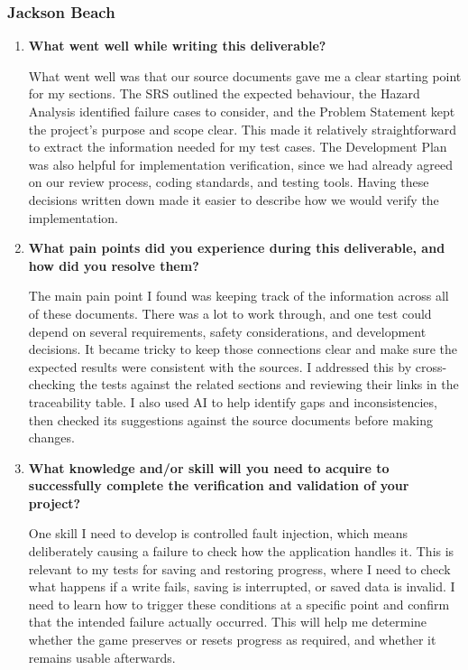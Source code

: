 \documentclass[10pt,titlepage]{article}
\begin{document}
\subsubsection*{Jackson Beach}

\begin{enumerate}

    \item \textbf{What went well while writing this deliverable?}

    What went well was that our source documents gave me a clear starting
    point for my sections. The SRS outlined the expected behaviour, the
    Hazard Analysis identified failure cases to consider, and the Problem
    Statement kept the project's purpose and scope clear. This made it
    relatively straightforward to extract the information needed for my
    test cases. The Development Plan was also helpful for implementation
    verification, since we had already agreed on our review process,
    coding standards, and testing tools. Having these decisions written
    down made it easier to describe how we would verify the implementation.

    \item \textbf{What pain points did you experience during this
    deliverable, and how did you resolve them?}

    The main pain point I found was keeping track of the information across
    all of these documents. There was a lot to work through, and one test
    could depend on several requirements, safety considerations, and
    development decisions. It became tricky to keep those connections clear
    and make sure the expected results were consistent with the sources.
    I addressed this by cross-checking the tests against the related
    sections and reviewing their links in the traceability table. I also
    used AI to help identify gaps and inconsistencies, then checked its
    suggestions against the source documents before making changes.

    \item \textbf{What knowledge and/or skill will you need to acquire to
    successfully complete the verification and validation of your project?}

    One skill I need to develop is controlled fault injection, which means
    deliberately causing a failure to check how the application handles it.
    This is relevant to my tests for saving and restoring progress, where
    I need to check what happens if a write fails, saving is interrupted,
    or saved data is invalid. I need to learn how to trigger these conditions
    at a specific point and confirm that the intended failure actually
    occurred. This will help me determine whether the game preserves or
    resets progress as required, and whether it remains usable afterwards.


\end{enumerate}
\end{document}
